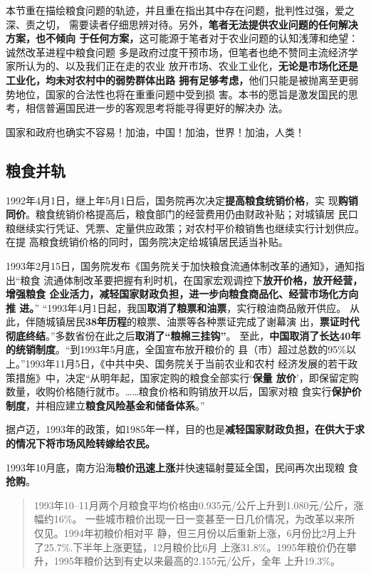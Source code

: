 本节重在描绘粮食问题的轨迹，并且重在指出其中存在问题，批判性过强，爱之深、责之切，
需要读者仔细思辨对待。另外，\textbf{笔者无法提供农业问题的任何解决方案，也不倾向
  于任何方案，}这可能源于笔者对于农业问题的认知浅薄和绝望：诚然改革进程中粮食问题
多是政府过度干预市场，但笔者也绝不赞同主流经济学家所认为的、以及我们正在走的农业
放开市场、农业工业化，\textbf{无论是市场化还是工业化，均未对农村中的弱势群体出路
  拥有足够考虑，}他们只能是被抛离至更弱势地位，国家的合法性也将在重重问题中受到损
害。本书的愿旨是激发国民的思考，相信普遍国民进一步的客观思考将能寻得更好的解决办
法。

国家和政府也确实不容易！加油，中国！加油，世界！加油，人类！

\subsection{粮食并轨}

1992年4月1日，继上年5月1日后，国务院再次决定\textbf{提高粮食统销价格}，实
现\textbf{购销同价}。粮食统销价格提高后，粮食部门的经营费用仍由财政补贴；对城镇居
民口粮继续实行凭证、凭票、定量供应政策；对农村平价粮销售也继续实行计划供应。在提
高粮食统销价格的同时，国务院决定给城镇居民适当补贴。

1993年2月15日，国务院发布《国务院关于加快粮食流通体制改革的通知》，通知指出“粮食
流通体制改革要把握有利时机，在国家宏观调控下\textbf{放开价格，放开经营，增强粮食
  企业活力，减轻国家财政负担，进一步向粮食商品化、经营市场化方向推
  进。}” “1993年4月1日起，我国\textbf{取消了粮票和油票}，实行粮油商品敞开供应。
从此，伴随城镇居民\textbf{38年历程}的粮票、油票等各种票证完成了谢幕演
出，\textbf{票证时代彻底终结}。”多数省份在此之后\textbf{取消了“粮棉三挂钩”}。
至此，\textbf{中国取消了长达40年的统销制度}。“到1993年5月底，全国宣布放开粮价的
县（市）超过总数的95\%以上。”1993年11月5日，《中共中央、国务院关于当前农业和农村
经济发展的若干政策措施》中，决定“从明年起，国家定购的粮食全部实行‘\textbf{保量
  放价}’，即保留定购数量，收购价格随行就市。……粮食价格和购销放开以后，国家对粮
食实行\textbf{保护价制度}，并相应建立\textbf{粮食风险基金和储备体系}。”

据卢迈，1993年的政策，如1985年一样，目的也是\textbf{减轻国家财政负担，在供大于求
  的情况下将市场风险转嫁给农民。}\cite{lumaisg}

1993年10月底，南方沿海\textbf{粮价迅速上涨}并快速辐射蔓延全国，民间再次出现粮
食\textbf{抢购}。
\begin{quotation}
  1993年10--11月两个月粮食平均价格由0.935元/公斤上升到1.080元/公斤，涨幅约16\%。
  一些城市粮价出现一日一变甚至一日几价情况，为改革以来所仅见。1994年初粮价相对平
  静，但三月份以后重新上涨，6月份比2月上升了25.7\%.下半年上涨更猛，12月粮价比6月
  上涨31.8\%。1995年粮价仍在攀升，1995年粮价达到有史以来最高的2.155元/公斤，全年
  上升19.3\%。\cite{lufengsanci}
\end{quotation}

